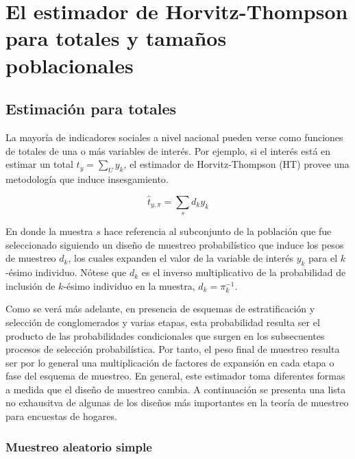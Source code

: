 \documentclass[
  12pt,
  spanish,
]{book}
\begin{document}
\hypertarget{el-estimador-de-horvitz-thompson-para-totales-y-tamauxf1os-poblacionales}{%
\section{El estimador de Horvitz-Thompson para totales y tamaños poblacionales}\label{el-estimador-de-horvitz-thompson-para-totales-y-tamauxf1os-poblacionales}}

\hypertarget{estimaciuxf3n-para-totales}{%
\subsection{Estimación para totales}\label{estimaciuxf3n-para-totales}}

La mayoría de indicadores sociales a nivel nacional pueden verse como funciones de totales de una o más variables de interés. Por ejemplo, si el interés está en estimar un total \(t_y=\sum_U y_k\), el estimador de Horvitz-Thompson (HT) provee una metodología que induce insesgamiento.

\[
\hat{t}_{y, \pi} = \sum_s d_k y_k
\]

En donde la muestra \(s\) hace referencia al subconjunto de la población que fue seleccionado siguiendo un diseño de muestreo probabilístico que induce los pesos de muestreo \(d_k\), los cuales expanden el valor de la variable de interés \(y_k\) para el \(k\)-ésimo individuo. Nótese que \(d_k\) es el inverso multiplicativo de la probabilidad de inclusión de \(k\)-ésimo individuo en la muestra, \(d_k = \pi_k^{-1}\).

Como se verá más adelante, en presencia de esquemas de estratificación y selección de conglomerados y varias etapas, esta probabilidad resulta ser el producto de las probabilidades condicionales que surgen en los subsecuentes procesos de selección probabilística. Por tanto, el peso final de muestreo resulta ser por lo general una multiplicación de factores de expansión en cada etapa o fase del esquema de muestreo. En general, este estimador toma diferentes formas a medida que el diseño de muestreo cambia. A continuación se presenta una lista no exhausitva de algunas de los diseños más importantes en la teoría de muestreo para encuestas de hogares.

\hypertarget{muestreo-aleatorio-simple-1}{%
\subsubsection*{Muestreo aleatorio simple}\label{muestreo-aleatorio-simple-1}}
\end{document}
